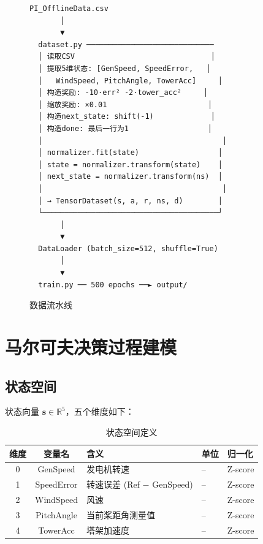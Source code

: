 \documentclass[11pt,a4paper]{ctexart}
\begin{document}
\begin{figure}[H]
\centering
\begin{verbatim}
PI_OfflineData.csv
       │
       ▼
  dataset.py ─────────────────────────────
  │ 读取CSV                               │
  │ 提取5维状态: [GenSpeed, SpeedError,   │
  │   WindSpeed, PitchAngle, TowerAcc]     │
  │ 构造奖励: -10·err² -2·tower_acc²     │
  │ 缩放奖励: ×0.01                       │
  │ 构造next_state: shift(-1)             │
  │ 构造done: 最后一行为1                  │
  │                                         │
  │ normalizer.fit(state)                  │
  │ state = normalizer.transform(state)    │
  │ next_state = normalizer.transform(ns)  │
  │                                         │
  │ → TensorDataset(s, a, r, ns, d)        │
  └────────────────────────────────────────┘
       │
       ▼
  DataLoader (batch_size=512, shuffle=True)
       │
       ▼
  train.py ── 500 epochs ──► output/
\end{verbatim}
\caption{数据流水线}
\end{figure}

\newpage

\section{马尔可夫决策过程建模}

\subsection{状态空间}

状态向量 $\mathbf{s} \in \mathbb{R}^5$，五个维度如下：

\begin{table}[H]
\centering
\caption{状态空间定义}
\begin{tabular}{cclll}
\toprule
\textbf{维度} & \textbf{变量名} & \textbf{含义} & \textbf{单位} & \textbf{归一化} \\
\midrule
0 & GenSpeed    & 发电机转速       & -- & Z-score \\
1 & SpeedError  & 转速误差 (Ref $-$ GenSpeed) & -- & Z-score \\
2 & WindSpeed   & 风速             & -- & Z-score \\
3 & PitchAngle  & 当前桨距角测量值  & -- & Z-score \\
4 & TowerAcc    & 塔架加速度       & -- & Z-score \\
\bottomrule
\end{tabular}
\end{table}
\end{document}
